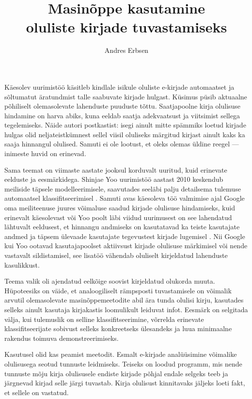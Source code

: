 \documentclass[]{trkuur}
\title{Masinõppe kasutamine \\ oluliste kirjade tuvastamiseks}
\author{Andres Erbsen}
\begin{document}
\maketitle
\tableofcontents


Käesolev uurimistöö käsitleb kindlale isikule oluliste e-kirjade automaatset ja sõltumatut
äratundmist talle saabuvate kirjade hulgast. Küsimus püsib aktuaalne põhiliselt
olemasolevate lahenduste puuduste tõttu. Saatjapoolne kirja olulisuse hindamine
on harva abiks, kuna eeldab saatja adekvaatsust ja viitsimist sellega
tegelemiseks. Näide autori postkastist: isegi ainult mitte spämmiks loetud
kirjade hulgas olid neljateistkümnest sellel viisil oluliseks märgitud kirjast
ainult kaks ka saaja hinnangul olulised. Samuti ei ole lootust, et oleks olemas
üldine reegel --- inimeste huvid on erinevad.

Sama teemat on viimaste aastate jooksul korduvalt uuritud, kuid erinevate
eelduste ja eesmärkidega. Shinjae Yoo uurimistöö aastast 2010 keskendub
meiliside täpsele modelleerimisele, saavutades seeläbi palju detailsema
tulemuse automaatsel klassifitseerimisel \autocite[2]{SYoo2010}. Samuti avas käesoleva 
töö valmimise ajal Google oma meiliteenuse juures võimaluse saadud
kirjade olulisuse hindamiseks, kuid erinevalt käesolevast või Yoo poolt
läbi viidud uurimusest on see lahendatud lähtuvalt eeldusest, et hinnangu
andmiseks on kasutatavad ka teiste kasutajate andmed ja täpsem ülevaade kasutajate tegevustest kirjade lugemisel \autocite[1]{PrInboxML}. Nii Google kui
Yoo ootavad kasutajapoolset aktiivsust kirjade olulisuse märkimisel
või nende vastavalt sildistamisel, see lisatöö vähendab oluliselt kirjeldatud
lahenduste kasulikkust.

Teema valik oli ajendatud eelkõige soovist kirjeldatud olukorda muuta. 
Hüpoteesiks on väide, et analoogiliselt rämpsposti tuvastamisele
on võimalik arvutil olemasolevate masinõppemeetodite abil ära tunda olulisi kirju, kasutades
selleks ainult kasutaja kirjakastis loomulikult leiduvat infot.
Eesmärk on selgitada välja, kui tulemuslik on selline klassifitseerimine,
võrrelda erinevate klassifitseerijate sobivust selleks konkreetseks ülesandeks
ja luua minimaalne rakendus toimuva demonstreerimiseks.

Kasutusel olid kas peamist meetodit.
Esmalt e-kirjade analüüsimine võimalike olulisusega
seotud tunnuste leidmiseks.
Teiseks on loodud programm, mis nende tunnuste
mõju kirja olulisusele endiste kirjade põhjal endale selgeks teeb ja järgnevad kirjad selle
järgi tuvastab. Kirja olulisust kinnitavaks jäljeks loeti fakt, et sellele on vastatud.
\end{document}

